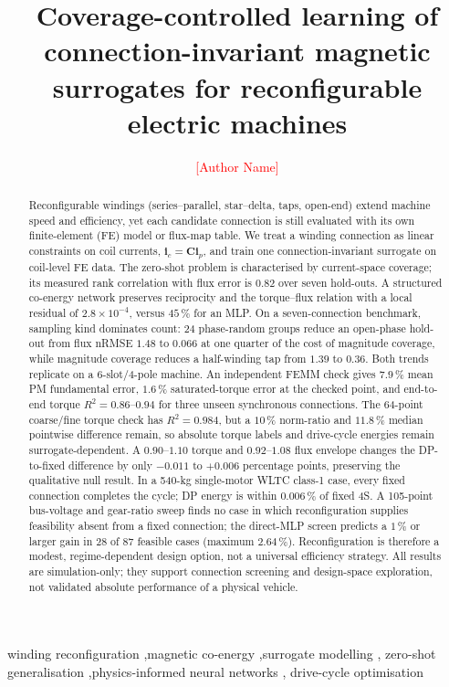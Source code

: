 \documentclass[review]{elsarticle}
\newcommand{\ic}{\boldsymbol{i}_c}
\newcommand{\ip}{\boldsymbol{i}_p}
\newcommand{\Cmat}{\boldsymbol{C}}
\newcommand{\todonum}[1]{\textcolor{red}{[#1]}}
\begin{document}
\begin{frontmatter}

\title{Coverage-controlled learning of connection-invariant magnetic
surrogates for reconfigurable electric machines}

\author[inst1]{\todonum{Author Name}}
\affiliation[inst1]{organization={\todonum{Affiliation}},
            city={\todonum{City}},
            country={\todonum{Country}}}

\begin{abstract}
Reconfigurable windings (series--parallel, star--delta, taps, open-end)
extend machine speed and efficiency, yet each candidate connection is
still evaluated with its own finite-element (FE) model or flux-map table.
We treat a winding
connection as linear constraints on coil currents, $\ic=\Cmat\ip$, and
train one connection-invariant surrogate on coil-level FE data. The
zero-shot problem is characterised by current-space coverage; its measured
rank correlation with flux error is $0.82$ over seven hold-outs. A
structured co-energy network preserves reciprocity and the torque--flux
relation with a local residual of $2.8\times10^{-4}$, versus $45\,\%$ for an MLP.
On a seven-connection benchmark, sampling kind dominates count: 24
phase-random groups reduce an
open-phase hold-out from flux nRMSE $1.48$ to $0.066$ at one quarter of the
cost of magnitude coverage, while magnitude coverage reduces a
half-winding tap from $1.39$ to $0.36$. Both trends replicate on a
6-slot/4-pole machine. An independent FEMM check gives $7.9\,\%$ mean PM
fundamental error, $1.6\,\%$ saturated-torque error at the checked point,
and end-to-end torque $R^2=0.86$--$0.94$ for three unseen synchronous
connections. The 64-point coarse/fine torque check has $R^2=0.984$, but a
$10\,\%$ norm-ratio and $11.8\,\%$ median pointwise difference remain, so
absolute torque labels and drive-cycle energies remain surrogate-dependent.
A $0.90$--$1.10$ torque and $0.92$--$1.08$ flux envelope changes the
DP-to-fixed difference by only $-0.011$ to $+0.006$ percentage points,
preserving the qualitative null result. In a
540-kg single-motor WLTC class-1 case, every fixed connection completes the
cycle; DP energy is within $0.006\,\%$ of fixed 4S. A 105-point bus-voltage and
gear-ratio sweep finds no case in which reconfiguration supplies
feasibility absent from a fixed connection; the direct-MLP screen predicts a
$1\,\%$ or larger gain in 28 of 87 feasible cases (maximum $2.64\,\%$).
Reconfiguration is therefore a modest, regime-dependent design option,
not a universal efficiency strategy. All results are simulation-only;
they support connection screening and design-space exploration, not
validated absolute performance of a physical vehicle.
\end{abstract}

\begin{keyword}
winding reconfiguration \sep magnetic co-energy \sep surrogate modelling \sep
zero-shot generalisation \sep physics-informed neural networks \sep
drive-cycle optimisation
\end{keyword}

\end{frontmatter}
\end{document}
